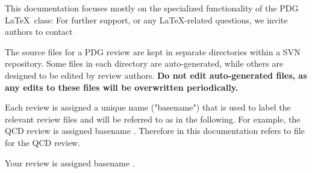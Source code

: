 This documentation focuses mostly on the specialized functionality of the PDG \LaTeX \ class: %
For further support, or any \LaTeX-related questions, we invite authors to contact
\vspace{-0.2cm}
\begin{center}
\end{center}

The source files for a PDG review are kept in separate directories within a SVN repository. 
Some files in each directory are auto-generated, while others are designed to be edited by review authors. 
\textbf{Do not edit auto-generated files, as any edits to these files will be overwritten periodically.}

Each review is assigned a unique name ("basename") that is used to label the relevant review files and will be referred to as  in the following. For example, the QCD review is assigned basename . Therefore  in this documentation refers to file  for the QCD review.

Your review is assigned basename .

